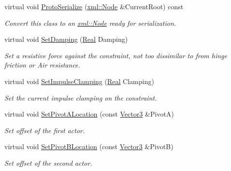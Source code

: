 \begin{DoxyCompactItemize}
virtual void \hyperlink{classMezzanine_1_1Point2PointConstraint_a8da49ad2d84a9ecebe6be1f11bfdf2b8}{ProtoSerialize} (\hyperlink{classMezzanine_1_1xml_1_1Node}{xml::Node} \&CurrentRoot) const 
\begin{DoxyCompactList}\small\item\em Convert this class to an \hyperlink{classMezzanine_1_1xml_1_1Node}{xml::Node} ready for serialization. \item\end{DoxyCompactList}\item 
virtual void \hyperlink{classMezzanine_1_1Point2PointConstraint_a85187ada76b4637851bd80cafcb3d704}{SetDamping} (\hyperlink{namespaceMezzanine_a726731b1a7df72bf3583e4a97282c6f6}{Real} Damping)
\begin{DoxyCompactList}\small\item\em Set a resistive force against the constraint, not too dissimilar to from hinge friction or Air resistance. \item\end{DoxyCompactList}\item 
virtual void \hyperlink{classMezzanine_1_1Point2PointConstraint_a609bf21f94cd31189f222350d4b0049e}{SetImpulseClamping} (\hyperlink{namespaceMezzanine_a726731b1a7df72bf3583e4a97282c6f6}{Real} Clamping)
\begin{DoxyCompactList}\small\item\em Set the current impulse clamping on the constraint. \item\end{DoxyCompactList}\item 
virtual void \hyperlink{classMezzanine_1_1Point2PointConstraint_a454b36d992f990e0058f2aba00ee8692}{SetPivotALocation} (const \hyperlink{classMezzanine_1_1Vector3}{Vector3} \&PivotA)
\begin{DoxyCompactList}\small\item\em Set offset of the first actor. \item\end{DoxyCompactList}\item 
virtual void \hyperlink{classMezzanine_1_1Point2PointConstraint_a746402f9ca269fc4838b8f3f1933dc48}{SetPivotBLocation} (const \hyperlink{classMezzanine_1_1Vector3}{Vector3} \&PivotB)
\begin{DoxyCompactList}\small\item\em Set offset of the second actor. \item\end{DoxyCompactList}\item 

\end{DoxyCompactItemize}
